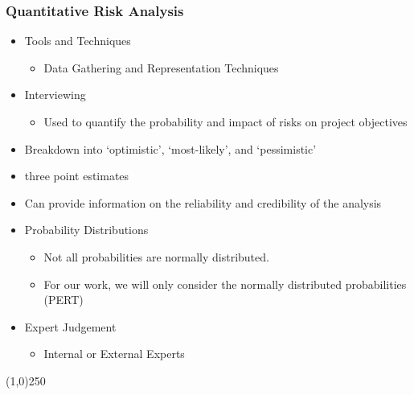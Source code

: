 \begin{frame}
\frametitle{Quantitative Risk Analysis}
\begin{itemize}
	\item Tools and Techniques
		\begin{itemize}
			\item Data Gathering and Representation Techniques
		\end{itemize}
	\item Interviewing
		\begin{itemize}
			\item Used to quantify the probability and impact of risks on project objectives
		\end{itemize}
	\item Breakdown into `optimistic', `most-likely', and `pessimistic' 
	\item three point estimates
	\item Can provide information on the reliability and credibility of the analysis
	\item Probability Distributions
		\begin{itemize}
			\item Not all probabilities are normally distributed.
			\item For our work, we will only consider the normally distributed probabilities (PERT)
		\end{itemize}
	\item Expert Judgement
		\begin{itemize}
			\item Internal or External Experts
		\end{itemize}
\end{itemize}
\end{frame}\begin{center}\line(1,0){250}\end{center}





	
	
	
